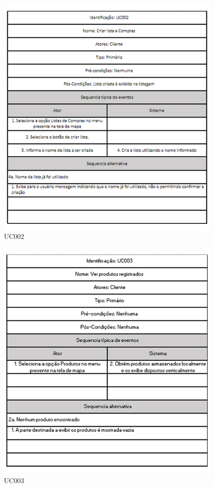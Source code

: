 \begin{figure}[H]
	\centering
		\caption{UC002}
		\includegraphics[scale=0.8]{Imagens/UC002.PNG}
\end{figure}
	
\begin{figure}[H]
	\centering
		\caption{UC003}
		\includegraphics[scale=0.8]{Imagens/UC003.PNG}
\end{figure}


